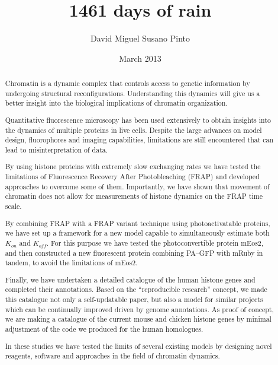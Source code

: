 \documentclass[a4paper,twoside,openright,draft]{memoir}
\author{David Miguel Susano Pinto}
\date{March 2013} %
\title{1461 days of rain} %
\begin{document}
  \frontmatter

  \maketitle

  \clearpage
  \tableofcontents
  \clearpage
  \listoffigures
  \clearpage
  \listoftables

  \clearpage
  \begin{abstract}  %

    Chromatin is a dynamic complex that controls access to genetic information by
    undergoing structural reconfigurations. Understanding this dynamics will give
    us a better insight into the biological implications of chromatin organization.

    Quantitative fluorescence microscopy has been used extensively to obtain insights
    into the dynamics of multiple proteins in live cells. Despite the large advances on
    model design, fluorophores and imaging capabilities, limitations are still
    encountered that can lead to misinterpretation of data.

    By using histone proteins with extremely slow exchanging rates we have tested the
    limitations of Fluorescence Recovery After Photobleaching (FRAP) and developed
    approaches to overcome some of them. Importantly, we have shown that movement of
    chromatin does not allow for measurements of histone dynamics on the FRAP time scale.

    By combining FRAP with a FRAP variant technique using photoactivatable proteins, we have
    set up a framework for a new model capable to simultaneously estimate both  $K_{on}$
    and  $K_{off}$. For this purpose we have tested the photoconvertible protein mEos2,
    and then constructed a new fluorescent protein combining PA--GFP with mRuby in tandem,
    to avoid the limitations of mEos2.

    Finally, we have undertaken a detailed catalogue of the human histone genes and completed
    their annotations. Based on the ``reproducible research'' concept, we made this
    catalogue not only a self-updatable paper, but also a model for similar projects
    which can be continually improved driven by genome annotations. As proof of concept, we
    are making a catalogue of the current mouse and chicken histone genes by minimal
    adjustment of the code we produced for the human homologues.

    In these studies we have tested the limits of several existing models by designing
    novel reagents, software and approaches in the field of chromatin dynamics.

  \end{abstract}

  \mainmatter

  
  
  
  
  
  
  

  \backmatter

  
  
\end{document}

